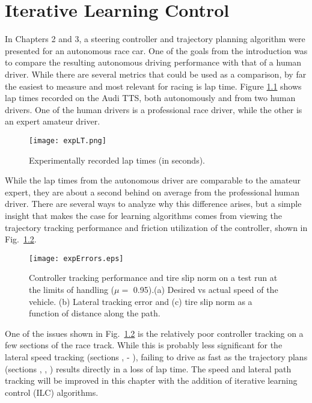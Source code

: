\chapter{Iterative Learning Control}
\label{chapter4}

In Chapters 2 and 3, a steering controller and trajectory planning algorithm were presented for an autonomous race car. One of the goals
from the introduction was to compare the resulting autonomous driving performance with that of a human driver. While there are
several metrics that could be used as a comparison, by far the easiest to measure and most relevant for racing is lap time. Figure
\ref{fig:expLT} shows lap times recorded on the Audi TTS, both autonomously and from two human drivers. One of the human drivers is a professional race
driver, while the other is an expert amateur driver. 

\begin{figure}[tb]
\centering
\texttt{[image: expLT.png]}
\caption{Experimentally recorded lap times (in seconds).}
\label{fig:expLT}
\end{figure}

While the lap times from the autonomous driver are comparable to the amateur expert, they are about a second behind on average from the professional
human driver. There are several ways to analyze why this difference arises, but a simple insight that makes the case for learning algorithms comes
from viewing the trajectory tracking performance and friction utilization of the controller, shown in Fig.~\ref{fig:expErrors}.

\begin{figure}
\centering
\texttt{[image: expErrors.eps]}
\caption{Controller tracking performance and tire slip norm on a test run at the limits of handling ($\mu =$ 0.95).(a) Desired
vs actual speed of the vehicle. (b) Lateral tracking error and (c) tire slip norm as a function of distance along the path.}
\label{fig:expErrors}
\end{figure}

One of the issues shown in Fig.~\ref{fig:expErrors} is the relatively poor controller tracking on a few sections of the race track. While
this is probably less significant for the lateral speed tracking (sections ,  - ), failing to drive as fast as the trajectory plans (sections , , ) results directly in a loss 
of lap time. The speed and lateral path tracking will be improved in this chapter with the addition of iterative learning control
(ILC) algorithms. 

